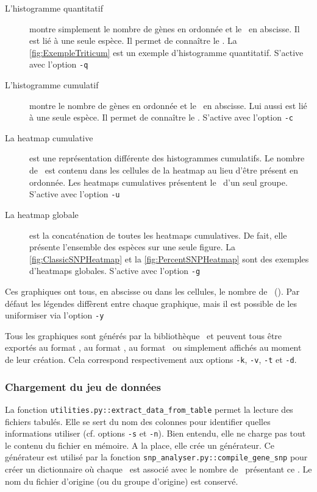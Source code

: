 \documentclass[../main]{subfiles} %
\begin{document}
\begin{description}
\item[L'histogramme quantitatif] montre simplement le nombre de gènes en ordonnée et le \NbSNP en abscisse.  Il est lié à une seule espèce. Il permet de connaître le  \GNSPeq. La \cref{fig:ExempleTriticum} est un exemple d'histogramme quantitatif. S'active avec l'option  \lstinline{-q}

\item[L'histogramme cumulatif] montre le nombre de gènes en ordonnée et le \NbSNP en abscisse. Lui aussi est lié à une seule espèce. Il permet de connaître le \GNSPge. 
S'active avec l'option  \lstinline{-c}
\item[La heatmap cumulative] est une représentation différente des histogrammes cumulatifs. Le nombre de \contigs est contenu dans les cellules de la heatmap au lieu d’être présent en ordonnée. Les heatmaps cumulatives présentent le \GNSPge d’un seul groupe. S'active avec l'option  \lstinline{-u}

\item [La heatmap globale] est la concaténation de toutes les heatmaps cumulatives. De fait, elle présente l’ensemble des espèces sur une seule figure. La \cref{fig:ClassicSNPHeatmap} et la \cref{fig:PercentSNPHeatmap} sont des exemples d'heatmaps globales. S'active avec l'option  \lstinline{-g}

\end{description}

Ces graphiques ont tous, en abscisse ou dans les cellules, le nombre de \SNP (\NbSNP). Par défaut les légendes diffèrent entre chaque graphique, mais il est possible de les uniformiser via l’option \lstinline{-y}

Tous les graphiques sont générés par la bibliothèque \MatPlotLib et peuvent tous être exportés au format \png, au format 
\svg, au format \tsv ou simplement affichés au moment de leur création. Cela correspond respectivement aux options \lstinline{-k}, \lstinline{-v}, \lstinline{-t} et \lstinline{-d}. 

\subsubsection{Chargement du jeu de données}
La fonction \lstinline{utilities.py::extract_data_from_table} permet la lecture des fichiers tabulés. Elle se sert du nom des colonnes pour identifier quelles informations utiliser (cf. options \lstinline{-s} et \lstinline{-n}). Bien entendu, elle ne charge pas tout le contenu du fichier en mémoire. A la place, elle crée un générateur. Ce générateur est utilisé par la fonction \lstinline{snp_analyser.py::compile_gene_snp} pour créer un dictionnaire où chaque \NbSNP est associé avec le nombre de \contigs présentant ce \NbSNP. Le nom du fichier d’origine (ou du groupe d’origine) est conservé. 
\end{document}
